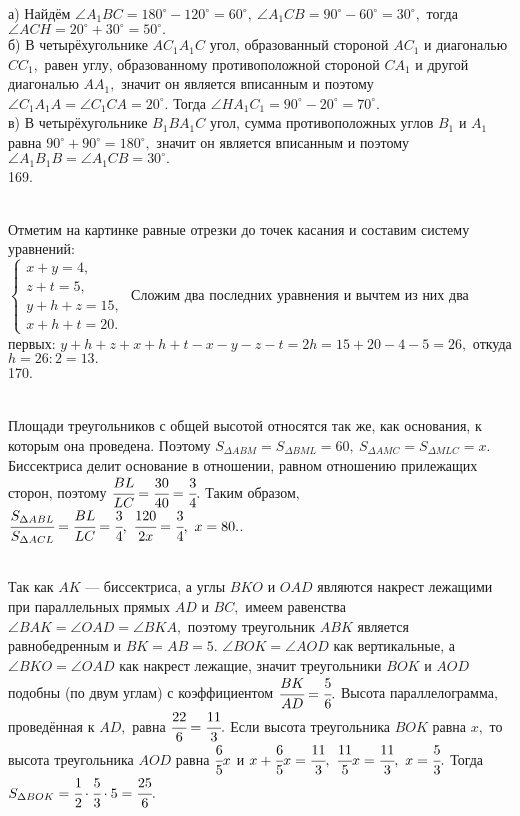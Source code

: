 а) Найдём $\angle A_1BC=180^\circ-120^\circ=60^\circ,\ \angle A_1CB=90^\circ-60^\circ=30^\circ,$ тогда $\angle ACH=20^\circ+30^\circ=50^\circ.$\\
б) В четырёхугольнике $AC_1A_1C$ угол, образованный стороной $AC_1$ и диагональю $CC_1,$ равен углу, образованному противоположной стороной $CA_1$ и другой диагональю $AA_1,$ значит он является вписанным и поэтому $\angle C_1A_1A=\angle C_1CA=20^\circ.$ Тогда $\angle HA_1C_1=90^\circ-20^\circ=70^\circ.$\\
в) В четырёхугольнике $B_1BA_1C$ угол, сумма противоположных углов $B_1$ и $A_1$ равна $90^\circ+90^\circ=180^\circ,$ значит он является вписанным и поэтому
$\angle A_1B_1B=\angle A_1CB=30^\circ.$\\
169. \begin{figure}[ht!]
\end{figure}\\
Отметим на картинке равные отрезки до точек касания и составим систему уравнений:\\ $\begin{cases}x+y=4,\\ z+t=5,\\ y+h+z=15,\\ x+h+t=20.\end{cases}$ Сложим два последних уравнения и вычтем из них два первых: $y+h+z+x+h+t-x-y-z-t=2h=15+20-4-5=26,$ откуда $h=26:2=13.$\\
170. \begin{figure}[ht!]
\end{figure}\\
Площади треугольников с общей высотой относятся так же, как основания, к которым она проведена. Поэтому $S_{\Delta ABM}=S_{\Delta BML}=60,\ S_{\Delta AMC}=S_{\Delta MLC}=x.$ Биссектриса делит основание в отношении, равном отношению прилежащих сторон, поэтому $\cfrac{BL}{LC}=\cfrac{30}{40}=\cfrac{3}{4}.$ Таким образом,
$\cfrac{S_{\Delta ABL}}{S_{\Delta ACL}}=\cfrac{BL}{LC}=\cfrac{3}{4},\ \cfrac{120}{2x}=\cfrac{3}{4},\ x=80.$\newpage{}. \begin{figure}[ht!]
\end{figure}\\
Так как $AK$ --- биссектриса, а углы $BKO$ и $OAD$ являются накрест лежащими при параллельных прямых $AD$ и $BC,$ имеем равенства $\angle BAK=\angle OAD=\angle BKA,$ поэтому треугольник $ABK$ является равнобедренным и $BK=AB=5.$ $\angle BOK=\angle AOD$ как вертикальные, а $\angle BKO=\angle OAD$ как накрест лежащие, значит треугольники $BOK$ и $AOD$ подобны (по двум углам) с коэффициентом $\cfrac{BK}{AD}=\cfrac{5}{6}.$ Высота параллелограмма, проведённая к $AD,$ равна $\cfrac{22}{6}=\cfrac{11}{3}.$ Если высота треугольника $BOK$ равна $x,$ то высота треугольника $AOD$ равна $\cfrac{6}{5}x$ и $x+\cfrac{6}{5}x=\cfrac{11}{3},\ \cfrac{11}{5} x=\cfrac{11}{3},\ x=\cfrac{5}{3}.$ Тогда $S_{\Delta BOK}=\cfrac{1}{2}\cdot\cfrac{5}{3}\cdot5=\cfrac{25}{6}.$\\
